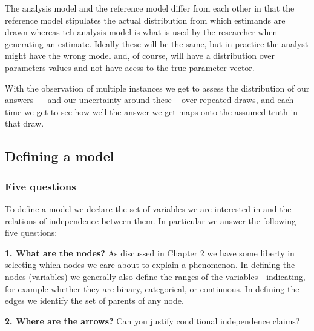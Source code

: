 \documentclass[
  12pt,
]{book}
\begin{document}
The analysis model and the reference model differ from each other in that the reference model stipulates the actual distribution from which estimands are drawn whereas teh analysis model is what is used by the researcher when generating an estimate. Ideally these will be the same, but in practice the analyst might have the wrong model and, of course, will have a distribution over parameters values and not have acess to the true parameter vector.

With the observation of multiple instances we get to assess the distribution of our answers --- and our uncertainty around these -- over repeated draws, and each time we get to see how well the answer we get maps onto the assumed truth in that draw.

\hypertarget{defining-a-model}{%
\subsection{Defining a model}\label{defining-a-model}}

\hypertarget{five-questions}{%
\subsubsection{Five questions}\label{five-questions}}

To define a model we declare the set of variables we are interested in and the relations of independence between them. In particular we answer the following five questions:

\textbf{1. What are the nodes?} As discussed in Chapter 2 we have some liberty in selecting which nodes we care about to explain a phenomenon. In defining the nodes (variables) we generally also define the ranges of the variables---indicating, for example whether they are binary, categorical, or continuous. In defining the edges we identify the set of parents of any node.

\textbf{2. Where are the arrows?} Can you justify conditional independence claims?
\end{document}
